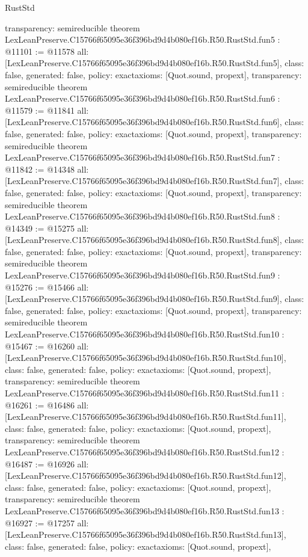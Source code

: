 \begin{lexlean}{RustStd}
\begin{coremodule}
{  transparency: semireducible
}
theorem LexLeanPreserve.C15766f65095e36f396bd9d4b080ef16b.R50.RustStd.fun5 : @11101 := @11578 {
  all: [LexLeanPreserve.C15766f65095e36f396bd9d4b080ef16b.R50.RustStd.fun5],
  class: false,
  generated: false,
  policy: exact{axioms: [Quot.sound, propext]},
  transparency: semireducible
}
theorem LexLeanPreserve.C15766f65095e36f396bd9d4b080ef16b.R50.RustStd.fun6 : @11579 := @11841 {
  all: [LexLeanPreserve.C15766f65095e36f396bd9d4b080ef16b.R50.RustStd.fun6],
  class: false,
  generated: false,
  policy: exact{axioms: [Quot.sound, propext]},
  transparency: semireducible
}
theorem LexLeanPreserve.C15766f65095e36f396bd9d4b080ef16b.R50.RustStd.fun7 : @11842 := @14348 {
  all: [LexLeanPreserve.C15766f65095e36f396bd9d4b080ef16b.R50.RustStd.fun7],
  class: false,
  generated: false,
  policy: exact{axioms: [Quot.sound, propext]},
  transparency: semireducible
}
theorem LexLeanPreserve.C15766f65095e36f396bd9d4b080ef16b.R50.RustStd.fun8 : @14349 := @15275 {
  all: [LexLeanPreserve.C15766f65095e36f396bd9d4b080ef16b.R50.RustStd.fun8],
  class: false,
  generated: false,
  policy: exact{axioms: [Quot.sound, propext]},
  transparency: semireducible
}
theorem LexLeanPreserve.C15766f65095e36f396bd9d4b080ef16b.R50.RustStd.fun9 : @15276 := @15466 {
  all: [LexLeanPreserve.C15766f65095e36f396bd9d4b080ef16b.R50.RustStd.fun9],
  class: false,
  generated: false,
  policy: exact{axioms: [Quot.sound, propext]},
  transparency: semireducible
}
theorem LexLeanPreserve.C15766f65095e36f396bd9d4b080ef16b.R50.RustStd.fun10 : @15467 := @16260 {
  all: [LexLeanPreserve.C15766f65095e36f396bd9d4b080ef16b.R50.RustStd.fun10],
  class: false,
  generated: false,
  policy: exact{axioms: [Quot.sound, propext]},
  transparency: semireducible
}
theorem LexLeanPreserve.C15766f65095e36f396bd9d4b080ef16b.R50.RustStd.fun11 : @16261 := @16486 {
  all: [LexLeanPreserve.C15766f65095e36f396bd9d4b080ef16b.R50.RustStd.fun11],
  class: false,
  generated: false,
  policy: exact{axioms: [Quot.sound, propext]},
  transparency: semireducible
}
theorem LexLeanPreserve.C15766f65095e36f396bd9d4b080ef16b.R50.RustStd.fun12 : @16487 := @16926 {
  all: [LexLeanPreserve.C15766f65095e36f396bd9d4b080ef16b.R50.RustStd.fun12],
  class: false,
  generated: false,
  policy: exact{axioms: [Quot.sound, propext]},
  transparency: semireducible
}
theorem LexLeanPreserve.C15766f65095e36f396bd9d4b080ef16b.R50.RustStd.fun13 : @16927 := @17257 {
  all: [LexLeanPreserve.C15766f65095e36f396bd9d4b080ef16b.R50.RustStd.fun13],
  class: false,
  generated: false,
  policy: exact{axioms: [Quot.sound, propext]},
}
\end{coremodule}
\end{lexlean}

